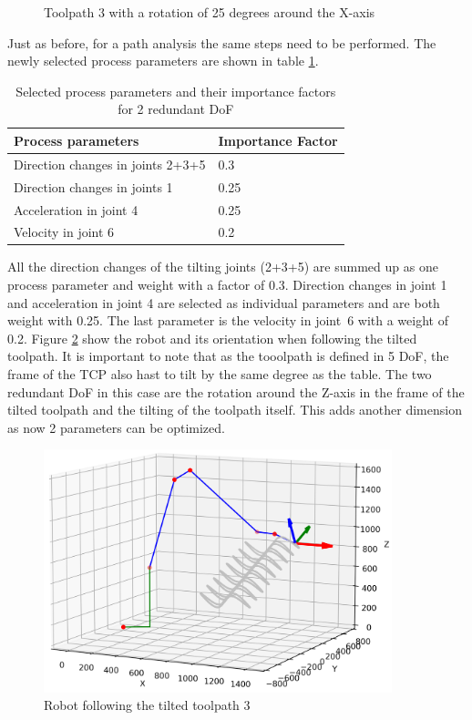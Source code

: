 \begin{figure}[H]
\begin{minipage}{0.5\textwidth}
		\caption{Toolpath 3 with a rotation of 25 degrees around the X-axis}
		\label{TP3_25}
	\end{minipage}\par
\end{figure}
 

Just as before, for a path analysis the same steps need to be performed. The newly selected process parameters are shown in table \ref{PP_2}.
\begin{table}[H]
	\centering
	\begin{tabular}{||l|l||}
		Process parameters& Importance Factor \\
		\hline
		\hline
		\hline
		Direction changes in joints 2+3+5	&		0.3 \\
		Direction changes in joints 1	&  	0.25 \\
		Acceleration in joint 4	& 		0.25\\
		Velocity in joint 6	& 		0.2\\
		\hline
		\hline
	\end{tabular}
	
	\caption{Selected process parameters and their importance factors for 2 redundant DoF}
	\label{PP_2}
\end{table}


All the direction changes of the tilting joints (2+3+5) are summed up as one process parameter and weight with a factor of 0.3. Direction changes in joint 1 and acceleration in joint 4 are selected as individual parameters and are both weight with 0.25. The last parameter is the velocity in joint~6 with a weight of 0.2.  
\newpage
Figure \ref{TP3_25_robot} show the robot and its orientation when following the tilted toolpath. It is important to note that as the tooolpath is defined in 5 DoF, the frame of the TCP also hast to tilt by the same degree as the table. The two redundant DoF in this case are the rotation around the Z-axis in the frame of the tilted toolpath and the tilting of the toolpath itself. This adds another dimension as now 2 parameters can be optimized.


\begin{figure}[H]
	\centerline{\includegraphics[width=0.9\textwidth]{figures/robotANDpath3_25.png}}
	\caption{Robot following the tilted toolpath 3}
	\label{TP3_25_robot}
\end{figure}

